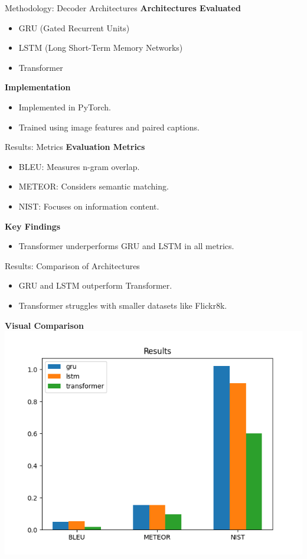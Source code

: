 \documentclass[10pt]{beamer}
\theoremstyle{remark}
\begin{document}
\begin{frame}{Methodology: Decoder Architectures}
	\textbf{Architectures Evaluated}
	\begin{itemize}
			\item GRU (Gated Recurrent Units)
			\item LSTM (Long Short-Term Memory Networks)
			\item Transformer
	\end{itemize}
	\textbf{Implementation}
	\begin{itemize}
			\item Implemented in PyTorch.
			\item Trained using image features and paired captions.
	\end{itemize}
\end{frame}

\begin{frame}{Results: Metrics}
	\textbf{Evaluation Metrics}
	\begin{itemize}
			\item BLEU: Measures n-gram overlap.
			\item METEOR: Considers semantic matching.
			\item NIST: Focuses on information content.
	\end{itemize}
	\textbf{Key Findings}
	\begin{itemize}
			\item Transformer underperforms GRU and LSTM in all metrics.
	\end{itemize}
\end{frame}

\begin{frame}{Results: Comparison of Architectures}
	\begin{itemize}
			\item GRU and LSTM outperform Transformer.
			\item Transformer struggles with smaller datasets like Flickr8k.
	\end{itemize}
	\textbf{Visual Comparison}
	\includegraphics[width=.6\textwidth]{res/metrics.png}
\end{frame}
\end{document}
